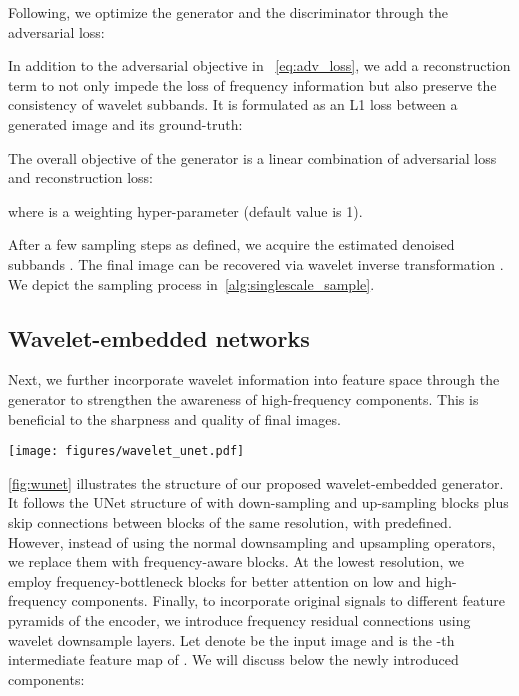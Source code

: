 \documentclass[10pt,twocolumn,letterpaper]{article}
\newcommand{\minisection}[1]{\vspace{2mm}\noindent{\textbf{#1}}}
\begin{document}
\minisection{Adversarial objective} Following\cite{xiao2021tackling}, we optimize the generator and the discriminator through the adversarial loss:



\minisection{Reconstruction term} In addition to the adversarial objective in ~\cref{eq:adv_loss}, we add a reconstruction term to not only impede the loss of frequency information but also preserve the consistency of wavelet subbands. It is formulated as an L1 loss between a generated image and its ground-truth:


The overall objective of the generator is a linear combination of adversarial loss and reconstruction loss:

where  is a weighting hyper-parameter (default value is 1). 

After a few sampling steps as defined, we acquire the estimated denoised subbands . The final image can be recovered via wavelet inverse transformation . We depict the sampling process in~\cref{alg:singlescale_sample}. 

\subsection{Wavelet-embedded networks}\label{sec:wavelet_feature}
Next, we further incorporate wavelet information into feature space through the generator to strengthen the awareness of high-frequency components. This is beneficial to the sharpness and quality of final images.

\begin{figure*}[t]
  \centering
\texttt{[image: figures/wavelet\_unet.pdf]}
   \vspace{-2mm}
   \caption{Illustration of Wavelet-embedded generator. For simplification, timestep embedding  and latent embedding  are ignored but they are injected in individual blocks of the denoising process. The inputs are noisy wavelet subbands of shape  at timestep , which are processed by a sequence of our proposed components, including frequency-aware upsampling and downsampling blocks, frequency residual connections, and a brand new frequency bottleneck block. The outputs of the model are the approximation of unperturbed inputs.}
   \label{fig:wunet}
   \vspace{-2mm}
\end{figure*}

\cref{fig:wunet} illustrates the structure of our proposed wavelet-embedded generator. It follows the UNet structure of \cite{song2020score} with  down-sampling and  up-sampling blocks plus skip connections between blocks of the same resolution, with  predefined. However, instead of using the normal downsampling and upsampling operators, we replace them with frequency-aware blocks. At the lowest resolution, we employ frequency-bottleneck blocks for better attention on low and high-frequency components. Finally, to incorporate original signals  to different feature pyramids of the encoder, we introduce frequency residual connections using wavelet downsample layers.
Let denote  be the input image and  is the -th intermediate feature map of . We will discuss below the newly introduced components:
\end{document}
